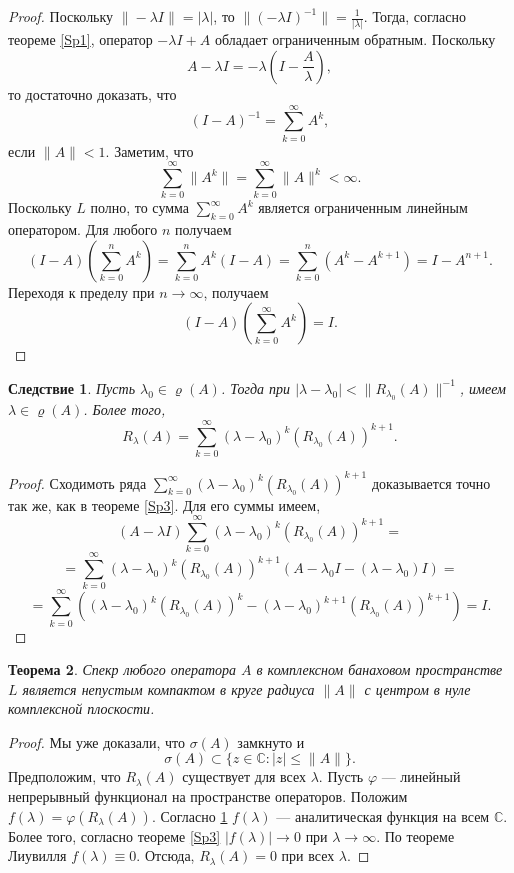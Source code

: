 \documentclass[12pt, titlepage, oneside]{amsbook}
\newcommand{\CC}{\mathbb{C}}
\newtheorem{theorem}{Теорема}[chapter]
\newtheorem{corollary}[theorem]{Следствие}
\theoremstyle{definition}
\theoremstyle{remark}
\begin{document}
\begin{proof}
Поскольку $\|-\lambda I\|=|\lambda|$, то $\|(-\lambda I)^{-1}\|=\frac{1}{|\lambda|}$. Тогда, согласно теореме \ref{Sp1}, оператор $-\lambda I+A$ обладает ограниченным обратным. Поскольку $$A-\lambda I=-\lambda(I-\frac{A}{\lambda}),$$ то достаточно доказать, что $$(I-A)^{-1}=\sum\limits_{k=0}^{\infty} A^k,$$ если $\|A\|<1$. Заметим, что $$\sum\limits_{k=0}^{\infty} \|A^k\|=\sum\limits_{k=0}^{\infty}\|A\|^k<\infty.$$ Поскольку $L$ полно, то сумма $\sum\limits_{k=0}^{\infty} A^k$ является ограниченным линейным оператором. Для любого $n$ получаем $$(I-A)\left(\sum\limits_{k=0}^{n} A^k\right)=\sum\limits_{k=0}^{n} A^k(I-A)=\sum\limits_{k=0}^{n} (A^k-A^{k+1})=I-A^{n+1}.$$ Переходя к пределу при $n\rightarrow\infty$, получаем $$(I-A)\left(\sum\limits_{k=0}^{\infty} A^k\right)=I.$$
\end{proof}


\begin{corollary}
\label{Sp4}
Пусть $\lambda_0\in\varrho(A)$. Тогда при $|\lambda-\lambda_0|<\|R_{\lambda_0}(A)\|^{-1}$, имеем $\lambda\in\varrho(A)$. Более того, $$R_{\lambda}(A)=\sum\limits_{k=0}^{\infty}(\lambda-\lambda_0)^k(R_{\lambda_0}(A))^{k+1}.$$
\end{corollary}

\begin{proof}
Сходимоть ряда $\sum\limits_{k=0}^{\infty}(\lambda-\lambda_0)^k(R_{\lambda_0}(A))^{k+1}$ доказывается точно так же, как в теореме \ref{Sp3}. Для его суммы имеем, $$(A-\lambda I)\sum\limits_{k=0}^{\infty}(\lambda-\lambda_0)^k(R_{\lambda_0}(A))^{k+1}=$$ $$=\sum\limits_{k=0}^{\infty}(\lambda-\lambda_0)^k(R_{\lambda_0}(A))^{k+1}(A-\lambda_0I-(\lambda-\lambda_0)I)=$$ $$=\sum\limits_{k=0}^{\infty}\left((\lambda-\lambda_0)^k(R_{\lambda_0}(A))^{k}-(\lambda-\lambda_0)^{k+1}(R_{\lambda_0}(A))^{k+1}\right)=I.$$
\end{proof}

\begin{theorem}
\label{Sp5}
Спекр любого оператора $A$ в комплексном банаховом пространстве $L$ является непустым компактом в круге радиуса $\|A\|$ с центром в нуле комплексной плоскости.
\end{theorem}

\begin{proof}
Мы уже доказали, что $\sigma(A)$ замкнуто и $$\sigma(A)\subset\{z\in\CC:|z|\leq\|A\|\}.$$ Предположим, что $R_{\lambda}(A)$ существует для всех $\lambda$. Пусть $\varphi$ --- линейный непрерывный функционал на пространстве операторов. Положим $f(\lambda)=\varphi(R_{\lambda}(A))$. Согласно \ref{Sp4} $f(\lambda)$ --- аналитическая функция на всем $\CC$. Более того, согласно теореме \ref{Sp3} $|f(\lambda)|\rightarrow 0$ при $\lambda\rightarrow\infty$. По теореме Лиувилля $f(\lambda)\equiv 0$. Отсюда, $R_{\lambda}(A)=0$ при всех $\lambda$.
\end{proof}
\end{document}
